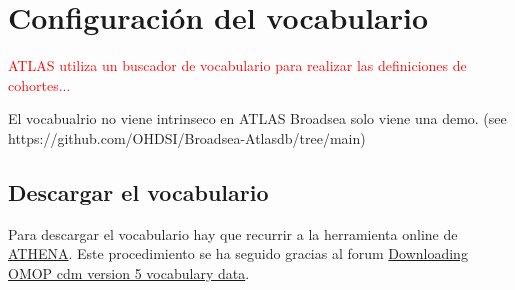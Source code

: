 \chapter{Configuración del vocabulario}

\textcolor{red}{ATLAS utiliza un buscador de vocabulario para realizar las definiciones de cohortes...}

El vocabualrio no viene intrinseco en ATLAS Broadsea solo viene una demo.  (see https://github.com/OHDSI/Broadsea-Atlasdb/tree/main)


\section{Descargar el vocabulario}

Para descargar el vocabulario hay que recurrir a la herramienta online de  \href{https://athena.ohdsi.org/}{ATHENA}. Este procedimiento se ha seguido gracias al forum \href{https://forums.ohdsi.org/t/downloading-omop-cdm-version-5-vocabulary-data/3321/3}{Downloading OMOP cdm version 5 vocabulary data}.

